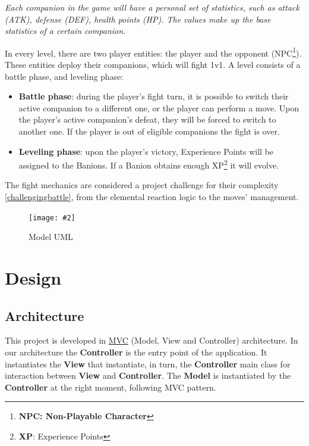\documentclass[12pt, a4paper]{report}
\newcommand*{\MyIncludeGraphics}[2][]{%
\begin{adjustbox}{max size={\textwidth}{\textheight}}
    \texttt{[image: \#2]}%
\end{adjustbox}
}
\theoremstyle{definition}
\begin{document}
    \textit{Each companion in the game will have a personal set of statistics, such as attack (ATK), defense (DEF), health points (HP).
    The values make up the base statistics of a certain companion.}

    In every level, there are two player entities: the player and the opponent (NPC\footnote{\textbf{NPC: Non-Playable Character}}). These entities deploy their companions, which will fight 1v1.
    A level consists of a battle phase, and leveling phase:
\begin{itemize}
    \item \textbf{Battle phase}: during the player's fight turn, it is possible to switch their active companion to a different one, 
        or the player can perform a move. Upon the player's active companion's defeat, they will be forced to switch to another one. 
        If the player is out of eligible companions the fight is over.
    \item \textbf{Leveling phase}: upon the player's victory, Experience Points will be assigned to the Banions. If a Banion obtains enough XP\footnote{\textbf{XP}: Experience Points} it will evolve.
\end{itemize}

    The fight mechanics are considered a project challenge for their complexity \ref{challengingbattle}, from the elemental reaction logic to the moves' management.

    \begin{figure}[H]
    \centering{}
    \caption{Model UML}
    \MyIncludeGraphics{model}
    \end{figure}

\chapter{Design}

\section{Architecture}

    This project is developed in \href{https://en.wikipedia.org/wiki/Model%E2%80%93view%E2%80%93controller}{MVC} (Model, View and Controller) architecture.
    In our architecture the \textbf{Controller} is the entry point of the application. It instantiates the \textbf{View} that instantiate, in turn, the
    \textbf{Controller} main class for interaction between \textbf{View} and \textbf{Controller}. The \textbf{Model} is instantiated by the \textbf{Controller}
    at the right moment, following MVC pattern.
\end{document}
